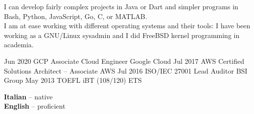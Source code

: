 \documentclass[9pt]{developercv}
\begin{document}

\begin{minipage}[t]{1\textwidth}
	\vspace{-\baselineskip}
	I can develop fairly complex projects in Java or Dart and simpler programs in Bash, Python, JavaScript, Go, C, or MATLAB.
	\\
	I am at ease working with different operating systems and their tools: I have been working as a GNU/Linux sysadmin and I did FreeBSD kernel programming in academia.
\end{minipage}


\begin{entrylist}
	\entryCert
		{Jun 2020}
		{GCP Associate Cloud Engineer}
		{Google Cloud}
	\entryCert
		{Jul 2017}
		{AWS Certified Solutions Architect -- Associate}
		{AWS}
	\entryCert
		{Jul 2016}
		{ISO/IEC 27001 Lead Auditor}
		{BSI Group}
	\entryCert
		{May 2013}
		{TOEFL iBT (108/120)}
		{ETS}
\end{entrylist}

\begin{minipage}[t]{1\textwidth}
	\vspace{-\baselineskip}

	
	\textbf{Italian} -- native\\
	\textbf{English} -- proficient
\end{minipage}
\end{document}
